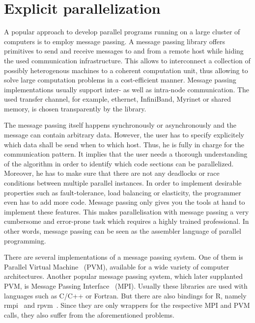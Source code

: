 \section{Explicit parallelization}

A popular approach to develop parallel programs running on a large cluster of computers is to employ message passing.
A message passing library offers primitives to send and receive messages to and from a remote host while hiding the used communication infrastructure.
This allows to interconnect a collection of possibly heterogenous machines to a coherent computation unit, thus allowing to solve large computation problems in a cost-efficient manner.
Message passing implementations usually support inter- as well as intra-node communication.
The used transfer channel, for example, ethernet, InfiniBand, Myrinet or shared memory, is chosen transparently by the library.

The message passing itself happens synchronously or asynchronously and the message can contain arbitrary data.
However, the user has to specify explicitely which data shall be send when to which host.
Thus, he is fully in charge for the communication pattern.
It implies that the user needs a thorough understanding of the algorithm in order to identify which code sections can be parallelized.
Moreover, he has to make sure that there are not any deadlocks or race conditions between multiple parallel instances.
In order to implement desirable properties such as fault-tolerance, load balancing or elasticity, the programmer even has to add more code.
Message passing only gives you the tools at hand to implement these features.
This makes parallelisation with message passing a very cumbersome and error-prone task which requires a highly trained professional.
In other words, message passing can be seen as the assembler language of parallel programming.

There are several implementations of a message passing system.
One of them is Parallel Virtual Machine~\cite{geist:1994a} (PVM), available for a wide variety of computer architectures.
Another popular message passing system, which later supplanted PVM, is Message Passing Interface~\cite{lusk:2009a} (MPI).
Usually these libraries are used with languages such as C/C++ or Fortran.
But there are also bindings for R, namely rmpi~\cite{rmpi} and rpvm~\cite{rpvm}.
Since they are only wrappers for the respective MPI and PVM calls, they also suffer from the aforementioned problems.

